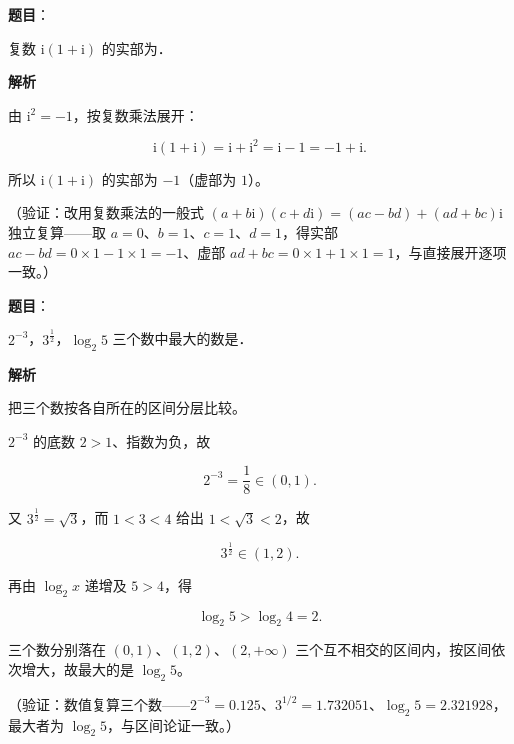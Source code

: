 \begin{answer}

\textbf{题目}：

复数 \(\mathrm{i}(1+\mathrm{i})\) 的实部为\gkblank{}．

\textbf{解析}

由 \(\mathrm{i}^{2}=-1\)，按复数乘法展开：

\nopagebreak[4]
\[
\mathrm{i}(1+\mathrm{i})=\mathrm{i}+\mathrm{i}^{2}=\mathrm{i}-1=-1+\mathrm{i}.
\]

所以 \(\mathrm{i}(1+\mathrm{i})\) 的实部为 \(-1\)（虚部为 \(1\)）。

（验证：改用复数乘法的一般式 \((a+b\mathrm{i})(c+d\mathrm{i})=(ac-bd)+(ad+bc)\mathrm{i}\) 独立复算——取 \(a=0\)、\(b=1\)、\(c=1\)、\(d=1\)，得实部 \(ac-bd=0\times1-1\times1=-1\)、虚部 \(ad+bc=0\times1+1\times1=1\)，与直接展开逐项一致。）


\end{answer}
\begin{answer}

\textbf{题目}：

\(2^{-3}\)，\(3^{\frac{1}{2}}\)，\(\log_{2}5\) 三个数中最大的数是\gkblank{}．

\textbf{解析}

把三个数按各自所在的区间分层比较。

\(2^{-3}\) 的底数 \(2>1\)、指数为负，故

\nopagebreak[4]
\[
2^{-3}=\frac{1}{8}\in(0,1).
\]

又 \(3^{\frac{1}{2}}=\sqrt{3}\)，而 \(1<3<4\) 给出 \(1<\sqrt{3}<2\)，故

\nopagebreak[4]
\[
3^{\frac{1}{2}}\in(1,2).
\]

再由 \(\log_{2}x\) 递增及 \(5>4\)，得

\nopagebreak[4]
\[
\log_{2}5>\log_{2}4=2.
\]

三个数分别落在 \((0,1)\)、\((1,2)\)、\((2,+\infty)\) 三个互不相交的区间内，按区间依次增大，故最大的是 \(\log_{2}5\)。

（验证：数值复算三个数——\(2^{-3}=0.125\)、\(3^{1/2}=1.732051\)、\(\log_{2}5=2.321928\)，最大者为 \(\log_{2}5\)，与区间论证一致。）


\end{answer}
